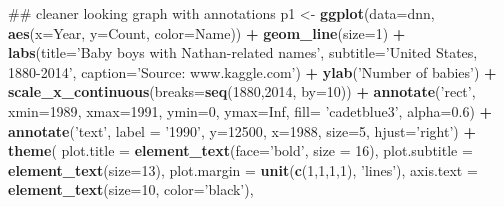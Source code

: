 \documentclass[]{article}
\newenvironment{Shaded}{\begin{snugshade}}{\end{snugshade}}
\newcommand{\KeywordTok}[1]{\textcolor[rgb]{0.13,0.29,0.53}{\textbf{#1}}}
\newcommand{\DataTypeTok}[1]{\textcolor[rgb]{0.13,0.29,0.53}{#1}}
\newcommand{\DecValTok}[1]{\textcolor[rgb]{0.00,0.00,0.81}{#1}}
\newcommand{\FloatTok}[1]{\textcolor[rgb]{0.00,0.00,0.81}{#1}}
\newcommand{\StringTok}[1]{\textcolor[rgb]{0.31,0.60,0.02}{#1}}
\newcommand{\OtherTok}[1]{\textcolor[rgb]{0.56,0.35,0.01}{#1}}
\newcommand{\OperatorTok}[1]{\textcolor[rgb]{0.81,0.36,0.00}{\textbf{#1}}}
\newcommand{\NormalTok}[1]{#1}
\begin{document}
\begin{Shaded}
\begin{Highlighting}[]
\NormalTok{## cleaner looking graph with annotations}
\NormalTok{p1 <-}\StringTok{ }\KeywordTok{ggplot}\NormalTok{(}\DataTypeTok{data=}\NormalTok{dnn, }\KeywordTok{aes}\NormalTok{(}\DataTypeTok{x=}\NormalTok{Year, }\DataTypeTok{y=}\NormalTok{Count, }\DataTypeTok{color=}\NormalTok{Name)) }\OperatorTok{+}\StringTok{ }
\StringTok{  }\KeywordTok{geom_line}\NormalTok{(}\DataTypeTok{size=}\DecValTok{1}\NormalTok{) }\OperatorTok{+}\StringTok{ }
\StringTok{  }\KeywordTok{labs}\NormalTok{(}\DataTypeTok{title=}\StringTok{'Baby boys with Nathan-related names'}\NormalTok{,}
       \DataTypeTok{subtitle=}\StringTok{'United States, 1880-2014'}\NormalTok{, }
       \DataTypeTok{caption=}\StringTok{'Source: www.kaggle.com'}\NormalTok{) }\OperatorTok{+}\StringTok{ }
\StringTok{  }\KeywordTok{ylab}\NormalTok{(}\StringTok{'Number of babies'}\NormalTok{) }\OperatorTok{+}
\StringTok{  }\KeywordTok{scale_x_continuous}\NormalTok{(}\DataTypeTok{breaks=}\KeywordTok{seq}\NormalTok{(}\DecValTok{1880}\NormalTok{,}\DecValTok{2014}\NormalTok{, }\DataTypeTok{by=}\DecValTok{10}\NormalTok{)) }\OperatorTok{+}
\StringTok{  }\KeywordTok{annotate}\NormalTok{(}\StringTok{'rect'}\NormalTok{, }\DataTypeTok{xmin=}\DecValTok{1989}\NormalTok{, }\DataTypeTok{xmax=}\DecValTok{1991}\NormalTok{, }\DataTypeTok{ymin=}\DecValTok{0}\NormalTok{, }\DataTypeTok{ymax=}\OtherTok{Inf}\NormalTok{, }\DataTypeTok{fill=} \StringTok{'cadetblue3'}\NormalTok{, }\DataTypeTok{alpha=}\FloatTok{0.6}\NormalTok{) }\OperatorTok{+}\StringTok{ }
\StringTok{  }\KeywordTok{annotate}\NormalTok{(}\StringTok{'text'}\NormalTok{, }\DataTypeTok{label =} \StringTok{'1990'}\NormalTok{, }\DataTypeTok{y=}\DecValTok{12500}\NormalTok{, }\DataTypeTok{x=}\DecValTok{1988}\NormalTok{, }\DataTypeTok{size=}\DecValTok{5}\NormalTok{, }\DataTypeTok{hjust=}\StringTok{'right'}\NormalTok{) }\OperatorTok{+}\StringTok{ }
\StringTok{  }\KeywordTok{theme}\NormalTok{(}
    \DataTypeTok{plot.title =} \KeywordTok{element_text}\NormalTok{(}\DataTypeTok{face=}\StringTok{'bold'}\NormalTok{, }\DataTypeTok{size =} \DecValTok{16}\NormalTok{),}
    \DataTypeTok{plot.subtitle =} \KeywordTok{element_text}\NormalTok{(}\DataTypeTok{size=}\DecValTok{13}\NormalTok{),}
    \DataTypeTok{plot.margin =} \KeywordTok{unit}\NormalTok{(}\KeywordTok{c}\NormalTok{(}\DecValTok{1}\NormalTok{,}\DecValTok{1}\NormalTok{,}\DecValTok{1}\NormalTok{,}\DecValTok{1}\NormalTok{), }\StringTok{'lines'}\NormalTok{),}
    \DataTypeTok{axis.text =} \KeywordTok{element_text}\NormalTok{(}\DataTypeTok{size=}\DecValTok{10}\NormalTok{, }\DataTypeTok{color=}\StringTok{'black'}\NormalTok{),}

\end{Highlighting}
\end{Shaded}
\end{document}
